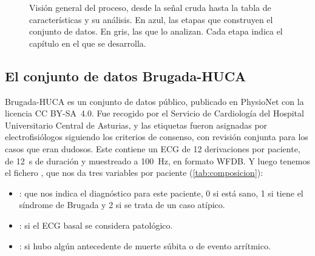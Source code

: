 \begin{figure}[H]
\caption[Visión general del proceso]{Visión general del proceso, desde la señal cruda hasta la tabla de características y su análisis. En azul, las etapas que construyen el conjunto de datos. En gris, las que lo analizan. Cada etapa indica el capítulo en el que se desarrolla.}
\label{fig:pipeline}
\end{figure}

\subsection{El conjunto de datos Brugada-HUCA}

Brugada-HUCA es un conjunto de datos público, publicado en PhysioNet con la licencia CC BY-SA~4.0. Fue recogido por el Servicio de Cardiología del Hospital Universitario Central de Asturias, y las etiquetas fueron asignadas por electrofisiólogos siguiendo los criterios de consenso, con revisión conjunta para los casos que eran dudosos. Este contiene un ECG de 12 derivaciones por paciente, de \SI{12}{\second} de duración y muestreado a \SI{100}{\hertz}, en formato WFDB. Y luego tenemos el fichero , que nos da tres variables por paciente (\cref{tab:composicion}):

\begin{itemize}
  \item {}: que nos indica el diagnóstico para este paciente, 0 si está sano, 1 si tiene el síndrome de Brugada y 2 si se trata de un caso atípico.
  \item {}: si el ECG basal se considera patológico.
  \item {}: si hubo algún antecedente de muerte súbita o de evento arrítmico.
\end{itemize}

